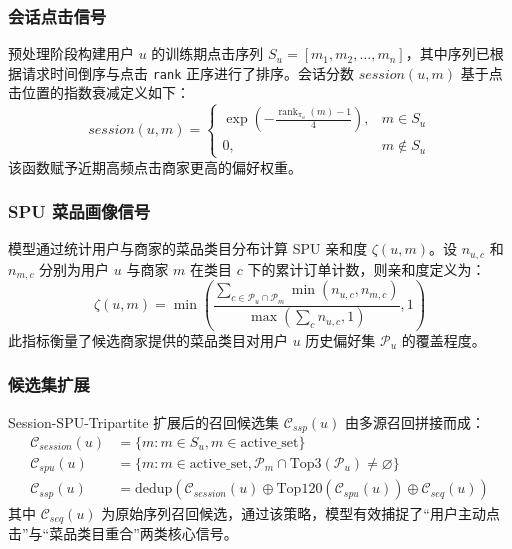 \documentclass[12pt,a4paper]{article}
\begin{document}
    \subsubsection{会话点击信号}
    预处理阶段构建用户 $u$ 的训练期点击序列 $S_u=[m_1, m_2, \ldots, m_n]$，其中序列已根据请求时间倒序与点击 \texttt{rank} 正序进行了排序。会话分数 $session(u,m)$ 基于点击位置的指数衰减定义如下：
    \begin{equation}
    	session(u,m)=
    	\begin{cases}
    		\exp\left(-\frac{\operatorname{rank}_{\pi_u}(m)-1}{4}\right), & m\in S_u \\
    		0, & m\notin S_u
    	\end{cases}
    \end{equation}
    该函数赋予近期高频点击商家更高的偏好权重。
    
    \subsubsection{SPU 菜品画像信号}
    模型通过统计用户与商家的菜品类目分布计算 SPU 亲和度 $\zeta(u,m)$。设 $n_{u,c}$ 和 $n_{m,c}$ 分别为用户 $u$ 与商家 $m$ 在类目 $c$ 下的累计订单计数，则亲和度定义为：
    \begin{equation}
    	\zeta(u,m)= \min\left( \frac{\sum_{c\in \mathcal{P}_u \cap \mathcal{P}_m}\min(n_{u,c},n_{m,c})} {\max(\sum_c n_{u,c}, 1)}, 1 \right)
    \end{equation}
    此指标衡量了候选商家提供的菜品类目对用户 $u$ 历史偏好集 $\mathcal{P}_u$ 的覆盖程度。
    
    \subsubsection{候选集扩展}
    Session-SPU-Tripartite 扩展后的召回候选集 $\mathcal{C}_{ssp}(u)$ 由多源召回拼接而成：
    \begin{align}
    	\mathcal{C}_{session}(u) &= \{m : m \in S_u, m \in \text{active\_set}\} \\
    	\mathcal{C}_{spu}(u) &= \{m : m \in \text{active\_set}, \mathcal{P}_m \cap \text{Top3}(\mathcal{P}_u) \neq \varnothing\} \\
    	\mathcal{C}_{ssp}(u) &= \text{dedup}\left( \mathcal{C}_{session}(u) \oplus \text{Top120}(\mathcal{C}_{spu}(u)) \oplus \mathcal{C}_{seq}(u) \right)
    \end{align}
    其中 $\mathcal{C}_{seq}(u)$ 为原始序列召回候选，通过该策略，模型有效捕捉了“用户主动点击”与“菜品类目重合”两类核心信号。
    
\end{document}
